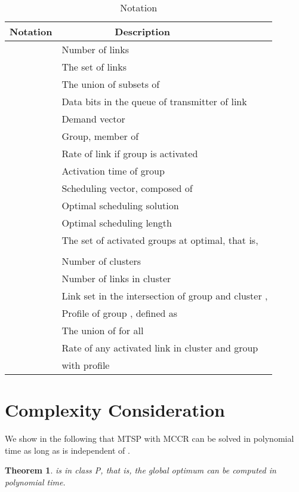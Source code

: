 \documentclass[10pt,onecolumn,journal,draftcls,oneside]{IEEEtran}
\newtheorem{theorem}{Theorem}
\begin{document}
\begin{table}
\caption{Notation}
\vspace{-2mm}
\label{tab:notation}
\centering
\begin{tabular}{ c | l }
\hline
\hline
 Notation  & ~~~~~~~~~ Description \\
\hline
\hline
					& Number of links \\
				& The set of  links \\
				& The union of subsets of  \\
				& Data bits in the queue of transmitter of link  \\
				& Demand vector  \\  
				& Group, member of  \\
			& Rate of link  if group  is activated \\
				& Activation time of group  \\
				& Scheduling vector, composed of  \\
				& Optimal scheduling solution \\
				& Optimal scheduling length \\
				& The set of activated groups at optimal, that is, \\ 
					&  \\
					& Number of clusters \\
				& Number of links in cluster  \\
				& Link set in the intersection of group  and cluster ,  \\
 			& Profile of group , defined as \\ 
 				& The union of  for all  \\
	& Rate of any activated link in cluster  and group  \\ 
					& with profile 
\\
\hline
\hline
\end{tabular}
\end{table}


\section{Complexity Consideration}
\label{sec:complex}

We show in the following that MTSP with MCCR can be solved in polynomial time as long as  is independent of .

\begin{theorem}
\label{theo:polynomialM}
 is in class P, that is, the global optimum can be computed in polynomial time.
\end{theorem}
\end{document}
